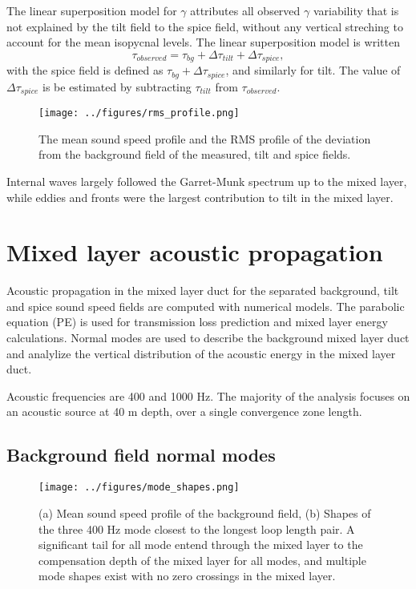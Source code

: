 \documentclass[preprint,NumberedRefs]{JASA}
\begin{document}
The linear superposition model for $\gamma$ attributes all observed $\gamma$ variability that is not explained by the tilt field to the spice field, without any vertical streching to account for the mean isopycnal levels. The linear superposition model is written
\begin{equation}
    \tau_{observed} = \tau_{bg} + \Delta \tau_{tilt} + \Delta \tau_{spice},
\end{equation}
with the spice field is defined as $\tau_{bg} + \Delta \tau_{spice}$, and similarly for tilt. The value of $\Delta \tau_{spice}$ is be estimated by subtracting $\tau_{tilt}$ from $\tau_{observed}$.

\begin{figure}
\texttt{[image: ../figures/rms\_profile.png]}
    \caption{\label{fig:c_rms}{The mean sound speed profile and the RMS profile of the deviation from the background field of the measured, tilt and spice fields. }}
\end{figure}

Internal waves largely followed the Garret-Munk spectrum up to the mixed layer, while eddies and fronts were the largest contribution to tilt in the mixed layer.

\section{\label{sec:propagation}Mixed layer acoustic propagation}
Acoustic propagation in the mixed layer duct for the separated background, tilt and spice sound speed fields are computed with numerical models. The parabolic equation (PE) is used for transmission loss prediction and mixed layer energy calculations. Normal modes are used to describe the background mixed layer duct and analylize the vertical distribution of the acoustic energy in the mixed layer duct.

Acoustic frequencies are 400 and 1000 Hz. The majority of the analysis focuses on an acoustic source at 40 m depth, over a single convergence zone length.

\subsection{Background field normal modes}
\begin{figure}
\texttt{[image: ../figures/mode\_shapes.png]}
    \caption{\label{fig:bg_modes}{(a) Mean sound speed profile of the background field, (b) Shapes of the three 400 Hz mode closest to the longest loop length pair. A significant tail for all mode entend through the mixed layer to the compensation depth of the mixed layer for all modes, and multiple mode shapes exist with no zero crossings in the mixed layer.}}
\end{figure}
\end{document}
